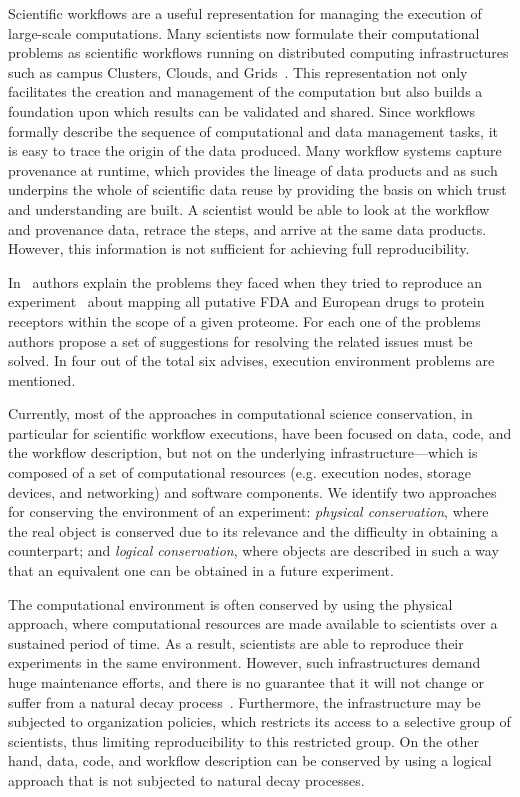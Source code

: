 Scientific workflows are a useful representation for managing the execution of large-scale computations. Many scientists now formulate their computational problems as scientific workflows running on distributed computing infrastructures such as campus Clusters, Clouds, and Grids~\cite{workflowBook}. This representation not only facilitates the creation and management of the computation but also builds a foundation upon which results can be validated and shared. Since workflows formally describe the sequence of computational and data management tasks, it is easy to trace the origin of the data produced. Many workflow systems capture provenance at runtime, which provides the lineage of data products and as such underpins the whole of scientific data reuse by providing the basis on which trust and understanding are built. A scientist would be able to look at the workflow and provenance data, retrace the steps, and arrive at the same data products. 
However, this information is not sufficient for achieving full reproducibility.

In~\cite{Garijo2013} authors explain the problems they faced when they tried to reproduce an experiment~\cite{drugomePrimer} about mapping all putative FDA and European drugs to protein receptors within the scope of a given proteome. For each one of the problems authors propose a set of suggestions for resolving the related issues must be solved. In four out of the total six advises, execution environment problems are mentioned.

Currently, most of the approaches in computational science conservation, in particular for scientific workflow executions, have been focused on data, code, and the workflow description, but not on the underlying infrastructure---which is composed of a set of computational resources (e.g. execution nodes, storage devices, and networking) and software components. We identify two approaches for conserving the environment of an experiment: \emph{physical conservation}, where the real object is conserved due to its relevance and the difficulty in obtaining a counterpart; and \emph{logical conservation}, where objects are described in such a way that an equivalent one can be obtained in a future experiment.

The computational environment is often conserved by using the physical approach, where computational resources are made available to scientists over a sustained period of time. As a result, scientists are able to reproduce their experiments in the same environment. However, such infrastructures demand huge maintenance efforts, and there is no guarantee that it will not change or suffer from a natural decay process~\cite{Gavish2011637}. Furthermore, the infrastructure may be subjected to organization policies, which restricts its access to a selective group of scientists, thus limiting reproducibility to this restricted group. On the other hand, data, code, and workflow description can be conserved by using a logical approach that is not subjected to natural decay processes. 

